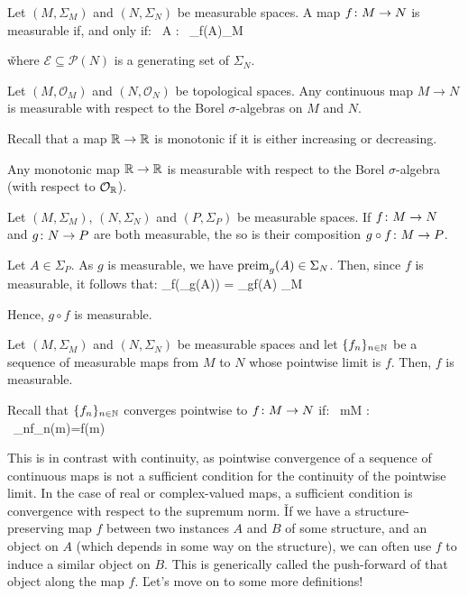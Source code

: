 \bt[]
Let $(M,\Sigma_M)$ and $(N,\Sigma_N)$ be measurable spaces. A map $f\colon M\to N$ is measurable if, and only if:
\bse
\forall \, A\in {} : \ \preim_f(A)\in \Sigma_M
\ese

\v

where $\mathcal{E}\subseteq\mathscr{P}(N)$ is a generating set of $\Sigma_N$.
\et

\bt[]
Let $(M,\mathcal{O}_M)$ and $(N,\mathcal{O}_N)$ be topological spaces. Any continuous map $M\to N$ is measurable with
respect to the Borel $\sigma$-algebras on $M$ and $N$.
\et

Recall that a map $\mathbb{R}\to\mathbb{R}$ is monotonic if it is either increasing or decreasing.

\bt[]
Any monotonic map $\mathbb{R}\to\mathbb{R}$ is measurable with respect to the Borel $\sigma$-algebra (with respect to
$\mathcal{O}_{\mathbb{R}}$).
\et

\bt[]
Let $(M,\Sigma_M)$, $(N,\Sigma_N)$ and $(P,\Sigma_P)$ be measurable spaces. If $f\colon M\to N$ and $g\colon N\to P$ are
both measurable, the so is their composition $g \circ f\colon M\to P$.
\et

\bq
Let $A\in \Sigma_P$. As $g$ is measurable, we have $\operatorname{preim}_g(A)\in\Sigma_N$. Then, since $f$ is measurable, it
follows that:
\bse
\preim_f(\preim_g(A)) = \preim_{g\circ f}(A) \in \Sigma_M
\ese

Hence, $g\circ f$ is measurable.
\eq

\bt[]
Let $(M,\Sigma_M)$ and $(N,\Sigma_N)$ be measurable spaces and let $\{f_n\}_{n\in\mathbb{N}}$ be a sequence of measurable
maps from $M$ to $N$ whose pointwise limit is $f$. Then, $f$ is measurable.
\et

Recall that $\{f_n\}_{n\in\mathbb{N}}$ converges pointwise to $f\colon M\to N$ if:
\bse
\forall \, m\in M : \ \lim_{n\to \infty}f_n(m)=f(m)
\ese

This is in contrast with continuity, as pointwise convergence of a sequence of continuous maps is not a sufficient
condition for the continuity of the pointwise limit. In the case of real or complex-valued maps, a sufficient
condition is convergence with respect to the supremum norm. \v

If we have a structure-preserving map $f$ between two instances $A$ and $B$ of some structure, and an object on $A$
(which depends in some way on the structure), we can often use $f$ to induce a similar object on $B$. This is
generically called the push-forward of that object along the map $f$. \v

Let's move on to some more definitions!

